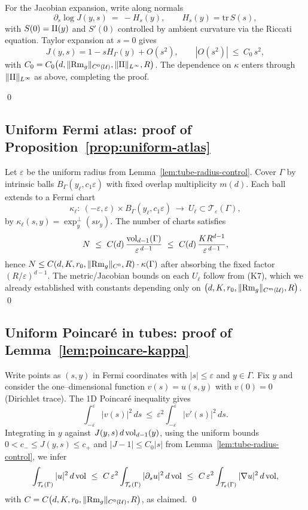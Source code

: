For the Jacobian expansion, write along normals
\[
\partial_s \log J(y,s)\ =\ - H_s(y),\qquad H_s(y)=\mathrm{tr}\,S(s),
\]
with $S(0)=\mathrm{II}(y)$ and $S'(0)$ controlled by ambient curvature via the Riccati equation.
Taylor expansion at $s=0$ gives
\[
J(y,s)=1-sH_\Gamma(y)+O(s^2),\qquad |O(s^2)|\ \le\ C_0\,s^2,
\]
with $C_0=C_0\big(d,\|{\rm Rm}_g\|_{C^0(\mathcal{U})},\|\mathrm{II}\|_{L^\infty},R\big)$.
The dependence on $\kappa$ enters through $\|\mathrm{II}\|_{L^\infty}$ as above, completing the proof.

\qed

\subsection{Uniform Fermi atlas: proof of Proposition~\ref{prop:uniform-atlas}}
\label{subsec:uniform-atlas}

Let $\varepsilon$ be the uniform radius from Lemma~\ref{lem:tube-radius-control}.
Cover $\Gamma$ by intrinsic balls $B_\Gamma(y_\ell,c_1\varepsilon)$ with fixed overlap multiplicity $m(d)$.
Each ball extends to a Fermi chart
\[
\kappa_\ell:\ (-\varepsilon,\varepsilon)\times B_\Gamma(y_\ell,c_1\varepsilon)\ \longrightarrow\ U_\ell\subset \mathcal{T}_\varepsilon(\Gamma),
\]
by $\kappa_\ell(s,y)=\exp^\perp_y(s\nu_y)$.
The number of charts satisfies
\[
N\ \le\ C(d)\,\frac{\vol_{d-1}(\Gamma)}{\varepsilon^{\,d-1}}\ \le\
C(d)\,\frac{K R^{d-1}}{\varepsilon^{\,d-1}},
\]
hence $N\le C(d,K,r_0,\|{\rm Rm}_g\|_{C^0},R)\cdot \kappa(\Gamma)$ after absorbing the fixed factor $(R/\varepsilon)^{d-1}$.
The metric/Jacobian bounds on each $U_\ell$ follow from (K7), which we already established with constants depending only on
$\big(d,K,r_0,\|{\rm Rm}_g\|_{C^m(\mathcal{U})},R\big)$.
\qed

\subsection{Uniform Poincaré in tubes: proof of Lemma~\ref{lem:poincare-kappa}}
\label{subsec:poincare}

Write points as $(s,y)$ in Fermi coordinates with $|s|\le \varepsilon$ and $y\in \Gamma$.
Fix $y$ and consider the one–dimensional function $v(s)=u(s,y)$ with $v(0)=0$ (Dirichlet trace).
The 1D Poincaré inequality gives
\[
\int_{-\varepsilon}^{\varepsilon} |v(s)|^2\,ds\ \le\ \varepsilon^2\int_{-\varepsilon}^{\varepsilon} |v'(s)|^2\,ds.
\]
Integrating in $y$ against $J(y,s)\,d\operatorname{vol}_{d-1}(y)$, using the uniform bounds
$0<c_-\le J(y,s)\le c_+$ and $|J-1|\le C_0|s|$ from Lemma~\ref{lem:tube-radius-control}, we infer
\[
\int_{\mathcal{T}_\varepsilon(\Gamma)} |u|^2\,d\vol\ \le\ C\,\varepsilon^2\int_{\mathcal{T}_\varepsilon(\Gamma)} |\partial_s u|^2\,d\vol
\ \le\ C\,\varepsilon^2\int_{\mathcal{T}_\varepsilon(\Gamma)} |\nabla u|^2\,d\vol,
\]
with $C=C\big(d,K,r_0,\|{\rm Rm}_g\|_{C^0(\mathcal{U})},R\big)$, as claimed.
\qed

